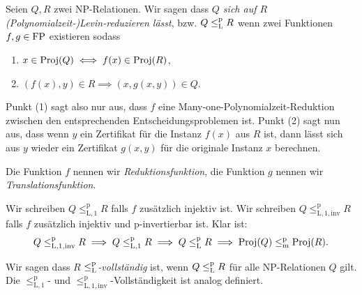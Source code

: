\begin{definition}
    Seien $Q, R$ zwei NP-Relationen. Wir sagen dass \emph{$Q$ sich auf $R$ (Polynomialzeit-)Levin-reduzieren lässt}, bzw. $Q\leq_\mathrm{L}^\mathrm{p} R$ wenn zwei Funktionen $f, g\in \mathrm{FP}$ existieren sodass
    \begin{enumerate}
        \item $x\in\operatorname{Proj}(Q) \iff f(x)\in\operatorname{Proj}(R)$,
        \item $(f(x), y)\in R \implies (x, g(x,y))\in Q$.
    \end{enumerate}
    Punkt (1) sagt also nur aus, dass $f$ eine Many-one-Polynomialzeit-Reduktion zwischen den entsprechenden Entscheidungsproblemen ist.
    Punkt (2) sagt nun aus, dass wenn $y$ ein Zertifikat für die Instanz $f(x)$ aus $R$ ist, dann lässt sich aus $y$ wieder ein Zertifikat $g(x,y)$ für die originale Instanz $x$ berechnen.

    Die Funktion $f$ nennen wir \emph{Reduktionsfunktion}, die Funktion $g$ nennen wir \emph{Translationsfunktion}.

    Wir schreiben $Q\leq_\mathrm{L,1}^\mathrm p R$ falls $f$ zusätzlich injektiv ist. Wir schreiben $Q\leq_\mathrm{L,1,inv}^\mathrm p R$ falls $f$ zusätzlich injektiv und p-invertierbar ist. Klar ist:
    \[ Q\leq_\mathrm{L,1,inv}^\mathrm p R \implies Q \leq_\mathrm{L,1}^\mathrm p R \implies Q \leq_\mathrm{L}^\mathrm{p} R \implies \operatorname{Proj}(Q) \leq_\mathrm{m}^\mathrm{p} \operatorname{Proj}(R). \]

    Wir sagen dass $R$ \emph{$\leq_\mathrm{L}^\mathrm{p}$-vollständig} ist, wenn $Q\leq_\mathrm{L}^\mathrm{p} R$ für alle NP-Relationen $Q$ gilt. Die $\leq_\mathrm{L,1}^\mathrm p$- und $\leq_\mathrm{L,1,inv}^\mathrm p$-Vollständigkeit ist analog definiert.
\end{definition}

